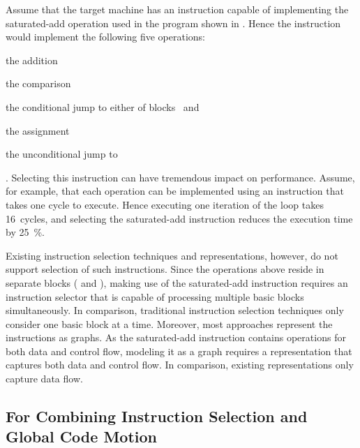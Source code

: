Assume that the \gls{target machine} has an instruction capable of implementing
the saturated-add \gls{operation} used in the \gls{program} shown in
.
%
Hence the \gls{instruction} would implement the following five
\glspl{operation}:%
%
\begin{inlinelist}[itemjoin={, }, itemjoin*={, and}]
  \item the  addition
  \item the  comparison
  \item the conditional jump to either of blocks~ and~
  \item the  assignment
  \item the unconditional jump to~
\end{inlinelist}.
%
Selecting this \gls{instruction} can have tremendous impact on performance.
%
Assume, for example, that each \gls{operation} can be implemented using an
\gls{instruction} that takes one cycle to execute.
%
Hence executing one iteration of the loop takes \num{16}~cycles, and selecting
the saturated-add \gls{instruction} reduces the execution time by
\SI{25}{\percent}.

Existing \gls{instruction selection} techniques and representations, however, do
not support selection of such \glspl{instruction}.
%
Since the \glspl{operation} above reside in separate \glspl{block}
( and ), making use of the saturated-add
\gls{instruction} requires an \gls{instruction selector} that is capable of
processing multiple \glspl{basic block} simultaneously.
%
In comparison, traditional \gls{instruction selection} techniques only consider
one \gls{basic block} at a time.
%
Moreover, most approaches represent the \glspl{instruction} as \glspl{graph}.
%
As the saturated-add \gls{instruction} contains \glspl{operation} for both data
and control flow, modeling it as a \gls{graph} requires a representation that
captures both data and control flow.
%
In comparison, existing representations only capture data flow.


\subsection{For Combining Instruction Selection and Global Code Motion}

